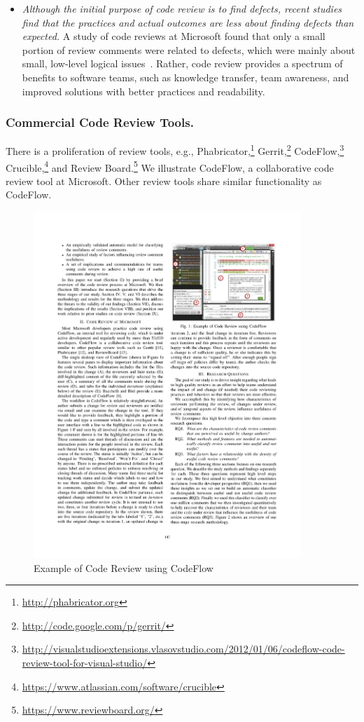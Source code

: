 \begin{itemize}
\item {\it Although the initial purpose of code review is to find defects, recent studies find that the practices and actual outcomes are less about finding defects than expected.} A study of code reviews at Microsoft found that only a small portion of review comments were related to defects, which were mainly about small, low-level logical issues~\cite{bacchelli2013expectations}. Rather, code review provides a spectrum of benefits to software teams, such as knowledge transfer, team awareness, and improved solutions with better practices and readability. 

\end{itemize} 

\subsubsection{Commercial Code Review Tools.} 
\label{sec:reviewtool} 

There is a proliferation of review tools, e.g., Phabricator,\footnote{\url{http://phabricator.org}} Gerrit,\footnote{\url{http://code.google.com/p/gerrit/}} CodeFlow,\footnote{\url{http://visualstudioextensions.vlasovstudio.com/2012/01/06/codeflow-code-review-tool-for-visual-studio/}} Crucible,\footnote{\url{https://www.atlassian.com/software/crucible}} and Review Board.\footnote{\url{https://www.reviewboard.org/}} We illustrate CodeFlow, a collaborative code review tool at Microsoft. Other review tools share similar functionality as CodeFlow.

\begin{figure}[ht]
 \centering
 \includegraphics[width=0.9\textwidth]{images/codeflow.pdf}
 \caption{Example of Code Review using CodeFlow~\cite{bosu2015characteristics}}
 \label{fig:codeflow}
\end{figure}

